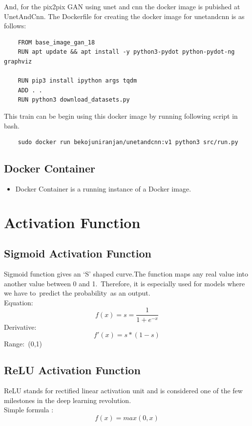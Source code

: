             And, for the pix2pix GAN using unet and cnn the docker image is pubished at UnetAndCnn\cite{unetandcnn}. The Dockerfile for creating the docker image for unetandcnn is as follows: 
\begin{verbatim}
    FROM base_image_gan_18
    RUN apt update && apt install -y python3-pydot python-pydot-ng graphviz
    
    RUN pip3 install ipython args tqdm
    ADD . .
    RUN python3 download_datasets.py 
\end{verbatim} 
            This train can be begin using this docker image by running following script in bash. 
\begin{verbatim}
    sudo docker run bekojuniranjan/unetandcnn:v1 python3 src/run.py
\end{verbatim}
        \subsection{Docker Container}
            \begin{itemize}%
                \item Docker Container is a running instance of a Docker image.
            \end{itemize}
    
    \section{Activation Function}
        \subsection{Sigmoid Activation Function}
            Sigmoid function gives an ‘S’ shaped curve.The function maps any real value into another value between 0 and 1. Therefore, it is especially used for models where we have to predict the probability as an output.\\
            Equation:
            \begin{equation}
                f(x) = s = \frac{1}{1+e^{-x}}
            \end{equation}
            Derivative:
            \begin{equation}
                f'(x) = s *(1-s)
            \end{equation}
            Range: (0,1)
        \subsection{ReLU Activation Function}
        ReLU stands for rectified linear activation unit and is considered one of the few milestones in the deep learning revolution.\\
        Simple formula : 
        \begin{equation}
            f(x)=max(0,x)
        \end{equation}

